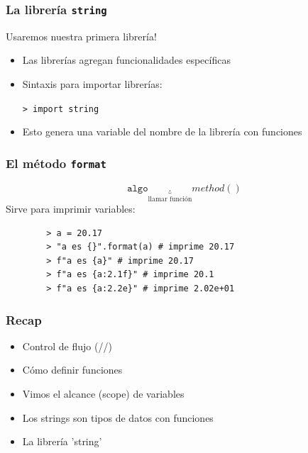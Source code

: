 \documentclass[14pt,aspectratio=169,xcolor=dvipsnames]{beamer}
\begin{document}
\begin{frame}\frametitle{La librería \texttt{string}}
    Usaremos nuestra primera librería!
    \begin{itemize}
        \item Las librerías agregan funcionalidades específicas
        \item Sintaxis para importar librerías: 
            \begin{flushright} \texttt{> import string} \end{flushright}
        \item Esto genera una variable del nombre de la librería con funciones
    \end{itemize}

\vspace{1cm}
\pause{}
\end{frame}
\begin{frame}[fragile]\frametitle{El método \texttt{format}}
    $$  \texttt{algo}\underbrace{.}_\text{llamar función}method() $$
Sirve para imprimir variables:
    \begin{verbatim}
        > a = 20.17
        > "a es {}".format(a) # imprime 20.17
        > f"a es {a}" # imprime 20.17
        > f"a es {a:2.1f}" # imprime 20.1
        > f"a es {a:2.2e}" # imprime 2.02e+01
    \end{verbatim}
\end{frame}
\begin{frame}\frametitle{Recap}
    \begin{itemize}
        \item Control de flujo (//)
        \item Cómo definir funciones
        \item Vimos el alcance (scope) de variables
        \item Los strings son tipos de datos con funciones
        \item La librería 'string'
    \end{itemize}
\end{frame}
\begin{frame}
    \maketitle
\end{frame}
\end{document}
